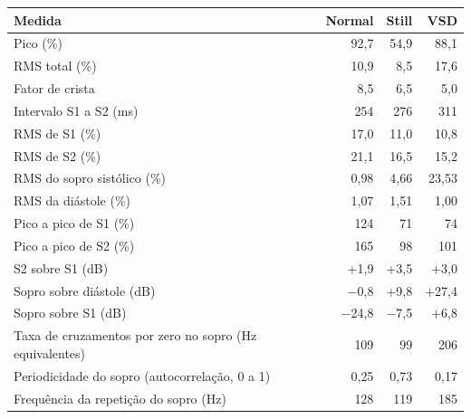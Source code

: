 \begin{tabular}{lrrr}
\toprule
\textbf{Medida} & \textbf{Normal} & \textbf{Still} & \textbf{VSD} \\
\midrule
Pico (\%) & 92{,}7 & 54{,}9 & 88{,}1 \\
RMS total (\%) & 10{,}9 & 8{,}5 & 17{,}6 \\
Fator de crista & 8{,}5 & 6{,}5 & 5{,}0 \\
Intervalo S1 a S2 (ms) & 254 & 276 & 311 \\
RMS de S1 (\%) & 17{,}0 & 11{,}0 & 10{,}8 \\
RMS de S2 (\%) & 21{,}1 & 16{,}5 & 15{,}2 \\
RMS do sopro sistólico (\%) & 0{,}98 & 4{,}66 & 23{,}53 \\
RMS da diástole (\%) & 1{,}07 & 1{,}51 & 1{,}00 \\
Pico a pico de S1 (\%) & 124 & 71 & 74 \\
Pico a pico de S2 (\%) & 165 & 98 & 101 \\
S2 sobre S1 (dB) & +1{,}9 & +3{,}5 & +3{,}0 \\
Sopro sobre diástole (dB) & $-$0{,}8 & +9{,}8 & +27{,}4 \\
Sopro sobre S1 (dB) & $-$24{,}8 & $-$7{,}5 & +6{,}8 \\
Taxa de cruzamentos por zero no sopro (Hz equivalentes) & 109 & 99 & 206 \\
Periodicidade do sopro (autocorrelação, 0 a 1) & 0{,}25 & 0{,}73 & 0{,}17 \\
Frequência da repetição do sopro (Hz) & 128 & 119 & 185 \\
\bottomrule
\end{tabular}

